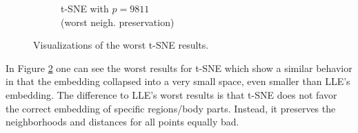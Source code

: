 \begin{figure}[!]
\begin{subfigure}[t]{0.49\columnwidth}
    	\caption{t-SNE with $p=9811$ \\ (worst neigh. preservation)}
        \label{fig:mammoth_tsne9811_plot}
    \end{subfigure}
     \caption[Visualization of Worst t-SNE Results]{Visualizations of the worst t-SNE results.}
    \label{fig:tsne_worst_vis}
\end{figure}

In Figure \ref{fig:tsne_worst_vis} one can see the worst results for t-SNE which show a similar behavior in that the embedding collapsed into a very small space, even smaller than LLE's embedding. The difference to LLE's worst results is that t-SNE does not favor the correct embedding of specific regions/body parts. Instead, it preserves the neighborhoods and distances for all points equally bad.

